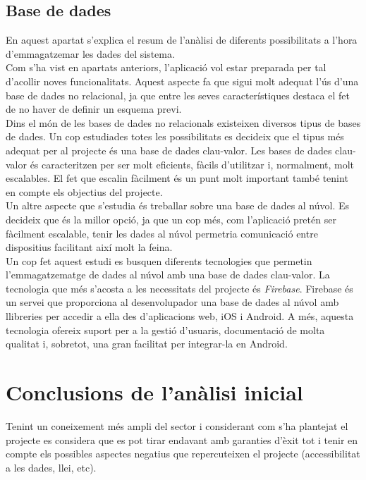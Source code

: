 \subsection{Base de dades}

En aquest apartat s'explica el resum de l'anàlisi de diferents possibilitats a l'hora d'emmagatzemar les dades del sistema.\\

Com s'ha vist en apartats anteriors, l'aplicació vol estar preparada per tal d'acollir noves funcionalitats. Aquest aspecte fa que sigui molt adequat l'ús d'una base de dades no relacional, ja que entre les seves característiques destaca el fet de no haver de definir un esquema previ.\\

Dins el món de les bases de dades no relacionals existeixen diversos tipus de bases de dades. Un cop estudiades totes les possibilitats es decideix que el tipus més adequat per al projecte és una base de dades clau-valor. Les bases de dades clau-valor és caracteritzen per ser molt eficients, fàcils d'utilitzar i, normalment, molt escalables. El fet que escalin fàcilment és un punt molt important també tenint en compte els objectius del projecte.\\

Un altre aspecte que s'estudia és treballar sobre una base de dades al núvol. Es decideix que és la millor opció, ja que un cop més, com l'aplicació pretén ser fàcilment escalable, tenir les dades al núvol permetria comunicació entre dispositius facilitant així molt la feina.\\

Un cop fet aquest estudi es busquen diferents tecnologies que permetin l'emmagatzematge de dades al núvol amb una base de dades clau-valor. La tecnologia que més s'acosta a les necessitats del projecte és \textit{Firebase}. Firebase és un servei que proporciona al desenvolupador una base de dades al núvol amb llibreries per accedir a ella des d'aplicacions web, iOS i Android. A més, aquesta tecnologia ofereix suport per a la gestió d'usuaris, documentació de molta qualitat i, sobretot, una gran facilitat per integrar-la en Android.

\clearpage

\section{Conclusions de l'anàlisi inicial}

Tenint un coneixement més ampli del sector i considerant com s'ha plantejat
el projecte es considera que es pot tirar endavant amb garanties d'èxit tot i
tenir en compte els possibles aspectes negatius que repercuteixen el projecte
(accessibilitat a les dades, llei, etc).

